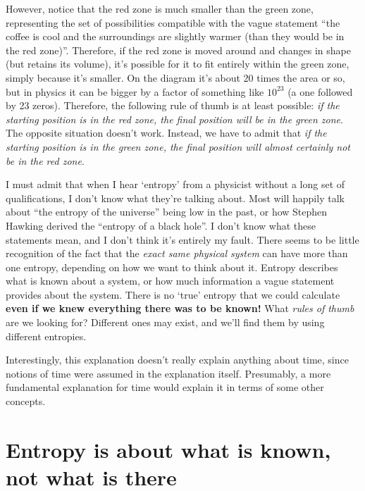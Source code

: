 \documentclass[a4paper, 12pt]{article}
\begin{document}
However, notice that the red zone is much smaller than the green zone,
representing the set of possibilities compatible with the vague statement
``the coffee is cool and the surroundings are slightly warmer (than they
would be in the red zone)''. Therefore, if the red zone is moved around and
changes in shape (but retains its volume), it's possible for it to fit entirely
within the green zone, simply because it's smaller.
On the diagram it's about 20 times the area or so,
but in physics it can be bigger by a factor of something like $10^{23}$
(a one followed by 23 zeros). Therefore, the following rule of thumb is at least
possible: {\em if the starting position is in the red zone, the final position
will be in the green zone}. The opposite situation doesn't work. Instead, we
have to admit that
{\em if the starting position is in the green zone, the final position will
almost certainly not be in the red zone}.





I must admit that when I hear `entropy' from a physicist without a long
set of qualifications, I don't know what they're talking about. Most will
happily talk about ``the entropy of the universe'' being low in the past,
or how Stephen Hawking derived the ``entropy of a black hole''.
I don't know what these statements mean,
and I don't think it's entirely my fault.
There seems to be little recognition of the fact
that the {\em exact same physical system}
can have more than one entropy, depending on how we want to think about it.
Entropy describes what is known about a system, or how much information a
vague statement provides about the system. There is no `true' entropy that
we could calculate {\bf even if we knew everything there was to be known!}
What {\em rules of thumb} are we looking for? Different ones may exist, and
we'll find them by using different entropies.

Interestingly, this explanation doesn't really explain anything about time,
since notions of time were assumed in the explanation itself. Presumably,
a more fundamental explanation for time would explain it in terms of some
other concepts.

\section*{Entropy is about what is known, not what is there}
\end{document}
